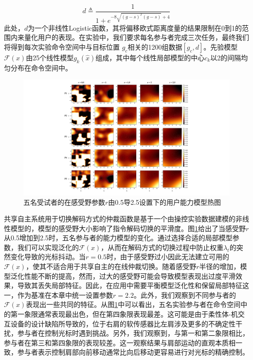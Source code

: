 \begin{equation}
    \label{ex12}
    d \triangleq \frac{1}{1+e^{-8\sqrt{(g-s)^T(g-s)}+4}} 
\end{equation}    
此处，$d$为一个非线性Logistic函数，其将偏移欧式距离度量的结果限制在0到1的范围内来量化用户的表现。在实验中，我们要求每名参与者完成三次任务，最终我们将得到每次实验命令空间中与目标位置   $g_c$相关的1200组数据$[g_c,d]$。先验模型$\mathcal{F}(x)$由25个线性模型$g_k(\hat x)$组成，其中每个线性局部模型的中心$c_k$以2的间隔均匀分布在命令空间中。
\begin{figure}[htb]
    \includegraphics[width=1\textwidth]{figures/3-Fig-11.pdf}
    \caption{五名受试者的在感受野参数$r$由0.5导2.5设置下的用户能力模型热图}
    \label{fig:3-11}
\end{figure}  

共享自主系统用于切换解码方式的仲裁函数是基于一个由操控实验数据建模的非线性模型的，模型的感受野大小影响了指令解码切换的平滑度。图\ref{fig:3-11}给出了当感受野$r$从0.5增加到2.5时，五名参与者的能力模型的变化。通过选择合适的局部模型参数，我们可以实现泛化的$\mathcal{F}(x)$，从而在解码方式的切换过程中防止权重$\lambda_t$的突然变化导致的光标抖动。当$r=0.5$时，由于感受野过小因此无法建立可用的$\mathcal{F}(x)$，使其不适合用于共享自主的在线仲裁切换。随着感受野$r$半径的增加，模型泛化性能不断的提高，然而，过大的感受野可能会导致模型表现出过度平滑效果，导致其丢失局部特征。因此，在应用中需要平衡模型泛化性和保留局部特征这一，作为基准在本章中统一设置参数$r=2.2$。此外，我们观察到不同参与者的$\mathcal{F}(x)$表现出一些共同的特征。从图\ref{fig:3-11}中可以看出，五名实验参与者在命令空间中的第一象限通常表现最出色，但在第四象限表现最差。这可能是由于柔性体-机交互设备的设计缺陷所导致的，位于右肩的软传感器比左肩涉及更多的不确定性干扰，参与者在控制光标时遇到挑战。另外，我们观察到，与第一和第二象限相比，参与者在第三和第四象限的表现较差。这一观察结果与肩部运动的直观本质相一致，参与者表示控制肩部向前移动通常比向后移动更容易进行对光标的精确控制。  

